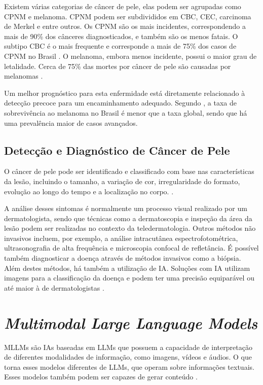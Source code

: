 Existem várias categorias de câncer de pele, elas podem ser agrupadas como \ac{CPNM} e melanoma. \ac{CPNM} podem ser
subdivididos em \ac{CBC}, \ac{CEC}, carcinoma de Merkel e entre outros. Os \ac{CPNM} são os mais incidentes,
correspondendo a mais de 90\% dos cânceres diagnosticados, e também são os menos fatais. O subtipo \ac{CBC} é o mais
frequente e corresponde a mais de 75\% dos casos de \ac{CPNM} no Brasil \cite{skin_cancer_zink}. O melanoma, embora
menos incidente, possui o maior grau de letalidade. Cerca de 75\% das mortes por câncer de pele são causadas por
melanomas \cite{skin_cancer_screening}.

Um melhor prognóstico para esta enfermidade está diretamente relacionado à detecção precoce para um encaminhamento
adequado. Segundo \textcite{skin_cancer_survival}, a taxa de sobrevivência ao melanoma no Brasil é menor que a taxa
global, sendo que há uma prevalência maior de casos avançados.

\subsection{Detecção e Diagnóstico de Câncer de Pele} \label{sec:skin_cancer_detection}

O câncer de pele pode ser identificado e classificado com base nas características da lesão, incluindo o tamanho, a
variação de cor, irregularidade do formato, evolução ao longo do tempo e a localização no corpo.
\cite{recognizing_skin_cancer}.

A análise desses sintomas é normalmente um processo visual realizado por um dermatologista, sendo que técnicas como a
dermatoscopia e inspeção da área da lesão podem ser realizadas no contexto da teledermatologia. Outros métodos não
invasivos incluem, por exemplo, a análise intracutânea espectrofotométrica, ultrasonografia de alta frequência e
microscopia confocal de refletância. É possível também diagnosticar a doença através de métodos invasivos como a
biópsia. Além destes métodos, há também a utilização de \ac{IA}. Soluções com \ac{IA} utilizam imagens para a
classificação da doença e podem ter uma precisão equiparável ou até maior à de dermatologistas
\cite{recognizing_skin_cancer, skin_cancer_ai}.

\section{\textit{Multimodal Large Language Models}}

\acp{MLLM} são \acp{IA} baseadas em \acp{LLM} que possuem a capacidade de interpretação de diferentes modalidades de
informação, como imagens, vídeos e áudios. O que torna esses modelos diferentes de \acp{LLM}, que operam sobre
informações textuais. Esses modelos também podem ser capazes de gerar conteúdo \cite{mllm_survey_2023,
mllm_survey_2024}.

